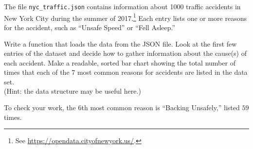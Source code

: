 \begin{problem} %
The file \texttt{nyc\_traffic.json} contains information about 1000 traffic accidents in New York City during the summer of 2017.\footnote{See \url{https://opendata.cityofnewyork.us/}.}
Each entry lists one or more reasons for the accident, such as ``Unsafe Speed'' or ``Fell Asleep.''

Write a function that loads the data from the JSON file.
Look at the first few entries of the dataset and decide how to gather information about the cause(s) of each accident.
Make a readable, sorted bar chart showing the total number of times that each of the $7$ most common reasons for accidents are listed in the data set.
\\ (Hint: the  data structure may be useful here.)

To check your work, the $6$th most common reason is ``Backing Unsafely,'' listed $59$ times.
\end{problem}

